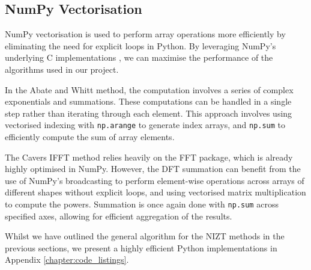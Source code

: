 \documentclass[a4paper]{report}
\begin{document}
\subsection{NumPy Vectorisation}
NumPy vectorisation is used to perform array operations more efficiently by eliminating the need for explicit loops in Python. By leveraging NumPy's underlying C implementations \citep{harris2020array}, we can maximise the performance of the algorithms used in our project.

In the Abate and Whitt method, the computation involves a series of complex exponentials and summations. These computations can be handled in a single step rather than iterating through each element. This approach involves using vectorised indexing with \texttt{np.arange} to generate index arrays, and \texttt{np.sum} to efficiently compute the sum of array elements.

The Cavers IFFT method relies heavily on the FFT package, which is already highly optimised in NumPy. However, the DFT summation can benefit from the use of NumPy's broadcasting to perform element-wise operations across arrays of different shapes without explicit loops, and using vectorised matrix multiplication to compute the powers. Summation is once again done with \texttt{np.sum} across specified axes, allowing for efficient aggregation of the results.

Whilst we have outlined the general algorithm for the NIZT methods in the previous sections, we present a highly efficient Python implementations in Appendix \ref{chapter:code_listings}.

\end{document}
